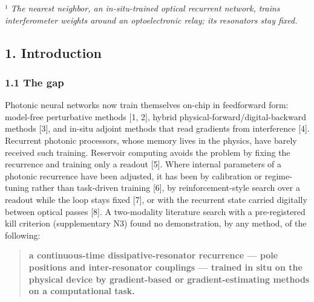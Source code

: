 \documentclass[
  10pt,
]{article}
\begin{document}
¹ \emph{The nearest neighbor, an in-situ-trained optical recurrent
network, trains interferometer weights around an optoelectronic relay;
its resonators stay fixed.}

\subsection{1. Introduction}\label{introduction}

\subsubsection{1.1 The gap}\label{the-gap}

Photonic neural networks now train themselves on-chip in feedforward
form: model-free perturbative methods {[}1, 2{]}, hybrid
physical-forward/digital-backward methods {[}3{]}, and in-situ adjoint
methods that read gradients from interference {[}4{]}. Recurrent
photonic processors, whose memory lives in the physics, have barely
received such training. Reservoir computing avoids the problem by fixing
the recurrence and training only a readout {[}5{]}. Where internal
parameters of a photonic recurrence have been adjusted, it has been by
calibration or regime-tuning rather than task-driven training {[}6{]},
by reinforcement-style search over a readout while the loop stays fixed
{[}7{]}, or with the recurrent state carried digitally between optical
passes {[}8{]}. A two-modality literature search with a pre-registered
kill criterion (supplementary N3) found no demonstration, by any method,
of the following:

\begin{quote}
\textbf{a continuous-time dissipative-resonator recurrence --- pole
positions and inter-resonator couplings --- trained in situ on the
physical device by gradient-based or gradient-estimating methods on a
computational task.}
\end{quote}
\end{document}

